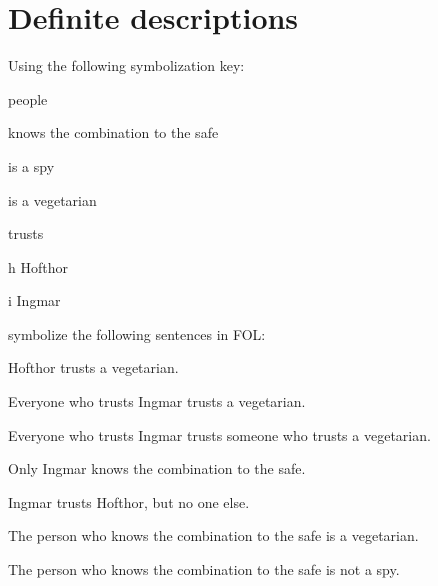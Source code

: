 \chapter{Definite descriptions}\setcounter{ProbPart}{0}
\problempart
Using the following symbolization key:
\begin{ekey}
\item[\text{论域}] people
\item[\atom{K}{x}]  knows the combination to the safe
\item[\atom{S}{x}]  is a spy
\item[\atom{V}{x}]  is a vegetarian
\item[\atom{T}{x,y}]  trusts 
\item[h] Hofthor
\item[i] Ingmar
\end{ekey}
symbolize the following sentences in FOL:
\begin{compactlist}
\item Hofthor trusts a vegetarian.
\item[] 
\item Everyone who trusts Ingmar trusts a vegetarian.
\item[] 
\item Everyone who trusts Ingmar trusts someone who trusts a vegetarian.
\item[] 
\item Only Ingmar knows the combination to the safe.
\item[] 
\item Ingmar trusts Hofthor, but no one else.
\item[] 
\item The person who knows the combination to the safe is a vegetarian.
\item[] 
\item The person who knows the combination to the safe is not a spy.
\item[] 
\end{compactlist}



